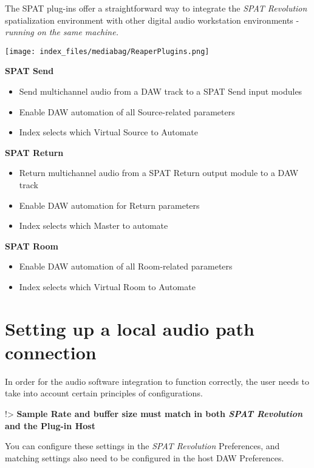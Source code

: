 \documentclass[
  letterpaper,
  DIV=11,
  numbers=noendperiod]{scrreport}
\begin{document}
The SPAT plug-ins offer a straightforward way to integrate the
\emph{SPAT Revolution} spatialization environment with other digital
audio workstation environments - \emph{running on the same machine.}

\texttt{[image: index\_files/mediabag/ReaperPlugins.png]}

\textbf{SPAT Send}

\begin{itemize}
\item
  Send multichannel audio from a DAW track to a SPAT Send input modules
\item
  Enable DAW automation of all Source-related parameters
\item
  Index selects which Virtual Source to Automate
\end{itemize}

\textbf{SPAT Return}

\begin{itemize}
\item
  Return multichannel audio from a SPAT Return output module to a DAW
  track
\item
  Enable DAW automation for Return parameters
\item
  Index selects which Master to automate
\end{itemize}

\textbf{SPAT Room}

\begin{itemize}
\item
  Enable DAW automation of all Room-related parameters
\item
  Index selects which Virtual Room to Automate
\end{itemize}

\hypertarget{setting-up-a-local-audio-path-connection}{%
\section{Setting up a local audio path
connection}\label{setting-up-a-local-audio-path-connection}}

In order for the audio software integration to function correctly, the
user needs to take into account certain principles of configurations.

!\textgreater{} \textbf{Sample Rate and buffer size must match in both
\emph{SPAT Revolution} and the Plug-in Host}

You can configure these settings in the \emph{SPAT Revolution}
Preferences, and matching settings also need to be configured in the
host DAW Preferences.
\end{document}
